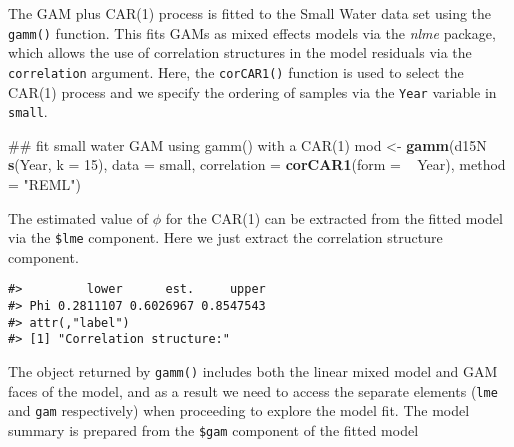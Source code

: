 \documentclass[12pt,]{article}
\newenvironment{Shaded}{\begin{snugshade}}{\end{snugshade}}
\newcommand{\KeywordTok}[1]{\textcolor[rgb]{0.13,0.29,0.53}{\textbf{{#1}}}}
\newcommand{\DataTypeTok}[1]{\textcolor[rgb]{0.13,0.29,0.53}{{#1}}}
\newcommand{\DecValTok}[1]{\textcolor[rgb]{0.00,0.00,0.81}{{#1}}}
\newcommand{\StringTok}[1]{\textcolor[rgb]{0.31,0.60,0.02}{{#1}}}
\newcommand{\NormalTok}[1]{{#1}}
\begin{document}
The GAM plus CAR(1) process is fitted to the Small Water data set using
the \texttt{gamm()} function. This fits GAMs as mixed effects models via
the \emph{nlme} package, which allows the use of correlation structures
in the model residuals via the \texttt{correlation} argument. Here, the
\texttt{corCAR1()} function is used to select the CAR(1) process and we
specify the ordering of samples via the \texttt{Year} variable in
\texttt{small}.

\begin{Shaded}
\begin{Highlighting}[]
\NormalTok{## fit small water GAM using gamm() with a CAR(1)}
\NormalTok{mod <-}\StringTok{ }\KeywordTok{gamm}\NormalTok{(d15N ~}\StringTok{ }\KeywordTok{s}\NormalTok{(Year, }\DataTypeTok{k =} \DecValTok{15}\NormalTok{), }\DataTypeTok{data =} \NormalTok{small,}
            \DataTypeTok{correlation =} \KeywordTok{corCAR1}\NormalTok{(}\DataTypeTok{form =} \NormalTok{~}\StringTok{ }\NormalTok{Year), }\DataTypeTok{method =} \StringTok{"REML"}\NormalTok{)}
\end{Highlighting}
\end{Shaded}

The estimated value of \(\phi\) for the CAR(1) can be extracted from the
fitted model via the \texttt{\$lme} component. Here we just extract the
correlation structure component.

\begin{Shaded}
\end{Shaded}

\begin{verbatim}
#>         lower      est.     upper
#> Phi 0.2811107 0.6026967 0.8547543
#> attr(,"label")
#> [1] "Correlation structure:"
\end{verbatim}

The object returned by \texttt{gamm()} includes both the linear mixed
model and GAM faces of the model, and as a result we need to access the
separate elements (\texttt{lme} and \texttt{gam} respectively) when
proceeding to explore the model fit. The model summary is prepared from
the \texttt{\$gam} component of the fitted model

\begin{Shaded}
\end{Shaded}
\end{document}
